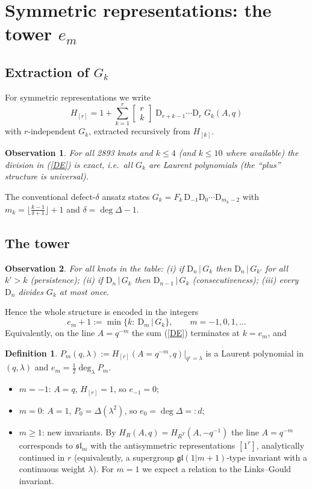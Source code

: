 \documentclass[11pt]{article}
\newtheorem{observation}{Observation}
\theoremstyle{definition}
\newtheorem{definition}{Definition}
\theoremstyle{remark}
\newcommand{\D}{\mathrm{D}}
\newcommand{\qbin}[2]{\left[\begin{smallmatrix}#1\\#2\end{smallmatrix}\right]}
\begin{document}
\section{Symmetric representations: the tower $e_m$}

\subsection{Extraction of $G_k$}
For symmetric representations we write
\begin{equation}\label{DE}
  H_{[r]}=1+\sum_{k=1}^{r}\qbin{r}{k}\;\D_{r+k-1}\cdots\D_{r}\;G_k(A,q)
\end{equation}
with $r$-independent $G_k$, extracted recursively from $H_{[k]}$.
\begin{observation}
For all 2893 knots and $k\le4$ (and $k\le 10$ where available) the division in (\ref{DE}) is exact,
i.e.\ all $G_k$ are Laurent polynomials (the ``plus'' structure is universal).
\end{observation}
The conventional defect-$\delta$ ansatz states
$G_k=F_k\,\D_{-1}\D_0\cdots\D_{m_k-2}$ with $m_k=\lfloor\frac{k-1}{\delta+1}\rfloor+1$ and
$\delta=\deg\Delta-1$.

\subsection{The tower}
\begin{observation}\label{obs:pers}
For all knots in the table:
(i) if $\D_n\,|\,G_k$ then $\D_n\,|\,G_{k'}$ for all $k'>k$ (persistence);
(ii) if $\D_n\,|\,G_k$ then $\D_{n-1}\,|\,G_k$ (consecutiveness);
(iii) every $\D_n$ divides $G_k$ at most once.
\end{observation}
Hence the whole structure is encoded in the integers
\[
  e_m+1:=\min\{k:\ \D_m\,|\,G_k\},\qquad m=-1,0,1,\dots
\]
Equivalently, on the line $A=q^{-m}$ the sum (\ref{DE}) terminates at $k=e_m$, and
\begin{definition}
$P_m(q,\lambda):=H_{[r]}(A=q^{-m},q)\big|_{q^r=\lambda}$ is a Laurent polynomial in $(q,\lambda)$
and $e_m=\tfrac12\deg_\lambda P_m$.
\end{definition}
\begin{itemize}
\item $m=-1$: $A=q$, $H_{[r]}=1$, so $e_{-1}=0$;
\item $m=0$: $A=1$, $P_0=\Delta(\lambda^2)$, so $e_0=\deg\Delta=:d$;
\item $m\ge1$: new invariants.  By $H_R(A,q)=H_{R^T}(A,-q^{-1})$ the line $A=q^{-m}$ corresponds to
$\mathfrak{sl}_m$ with the antisymmetric representations $[1^r]$, analytically continued in $r$
(equivalently, a supergroup $\mathfrak{gl}(1|m+1)$-type invariant with a continuous weight $\lambda$).
For $m=1$ we expect a relation to the Links--Gould invariant.
\end{itemize}
\end{document}
